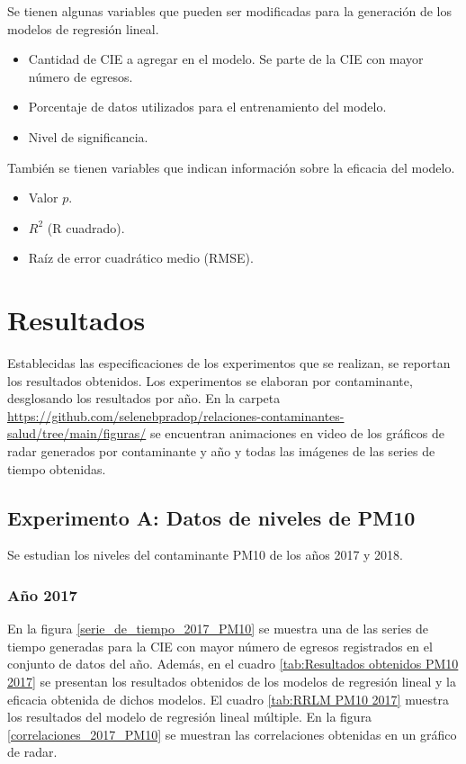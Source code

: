 Se tienen algunas variables que pueden ser modificadas para la generación de los modelos de regresión lineal.

\begin{itemize}
	\item Cantidad de CIE a agregar en el modelo. Se parte de la CIE con mayor número de egresos.
	\item Porcentaje de datos utilizados para el entrenamiento del modelo.
	\item Nivel de significancia.
\end{itemize}

También se tienen variables que indican información sobre la eficacia del modelo.

\begin{itemize}
	\item Valor $p$.
	\item $R^2$ (R cuadrado).
	\item Raíz de error cuadrático medio (RMSE).
\end{itemize}


\clearpage
\section{Resultados}
Establecidas las especificaciones de los experimentos que se realizan, se reportan los resultados obtenidos. Los experimentos se elaboran por contaminante, desglosando los resultados por año. En la carpeta \url{https://github.com/selenebpradop/relaciones-contaminantes-salud/tree/main/figuras/} se encuentran animaciones en video de los gráficos de radar generados por contaminante y año y todas las imágenes de las series de tiempo obtenidas.

\subsection{Experimento A: Datos de niveles de PM10}
Se estudian los niveles del contaminante PM10 de los años 2017 y 2018. 

\subsubsection{Año 2017}
En la figura \ref{serie_de_tiempo_2017_PM10} se muestra una de las series de tiempo generadas para la CIE con mayor número de egresos registrados en el conjunto de datos del año. Además, en el cuadro \ref{tab:Resultados obtenidos PM10 2017} se presentan los resultados obtenidos de los modelos de regresión lineal y la eficacia obtenida de dichos modelos. El cuadro \ref{tab:RRLM PM10 2017} muestra los resultados del modelo de regresión lineal múltiple. En la figura \ref{correlaciones_2017_PM10} se muestran las correlaciones obtenidas en un gráfico de radar.


